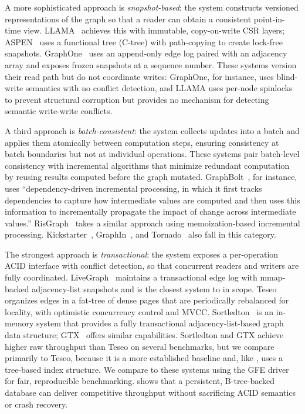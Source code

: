 A more sophisticated approach is \emph{snapshot-based}: the system constructs versioned representations of the graph so that a reader can obtain a consistent point-in-time view.
LLAMA~\cite{llama} achieves this with immutable, copy-on-write CSR layers; ASPEN~\cite{10.1145/3314221.3314598} uses a functional tree (C-tree) with path-copying to create lock-free snapshots.
GraphOne~\cite{graphone2019kumar} uses an append-only edge log paired with an adjacency array and exposes frozen snapshots at a sequence number.
These systems version their read path but do not coordinate writes: GraphOne, for instance, uses blind-write semantics with no conflict detection, and LLAMA uses per-node spinlocks to prevent structural corruption but provides no mechanism for detecting semantic write-write conflicts.

A third approach is \emph{batch-consistent}: the system collects updates into a batch and applies them atomically between computation steps, ensuring consistency at batch boundaries but not at individual operations.
These systems pair batch-level consistency with incremental algorithms that minimize redundant computation by reusing results computed before the graph mutated.
GraphBolt~\cite{mariappan2019graphbolt}, for instance, uses ``dependency-driven incremental processing, in which it first tracks dependencies to capture how intermediate values are computed and then uses this information to incrementally propagate the impact of change across intermediate values.''
RisGraph~\cite{feng2021risgraph} takes a similar approach using memoization-based incremental processing.
Kickstarter~\cite{vora2017kickstarter}, GraphIn~\cite{sengupta2016graphin}, and Tornado~\cite{shi2016tornado} also fall in this category.

The strongest approach is \emph{transactional}: the system exposes a per-operation ACID interface with conflict detection, so that concurrent readers and writers are fully coordinated.
LiveGraph~\cite{zhu2019livegraph} maintains a transactional edge log with mmap-backed adjacency-list snapshots and is the closest system to \project{} in scope.
Teseo~\cite{teseo2021deLeo} organizes edges in a fat-tree of dense pages that are periodically rebalanced for locality, with optimistic concurrency control and MVCC.
Sortledton~\cite{sortledton2022Fuchs} is an in-memory system that provides a fully transactional adjacency-list-based graph data structure; GTX~\cite{libinzhou2025GTX} offers similar capabilities.
Sortledton and GTX achieve higher raw throughput than Teseo on several benchmarks, but we compare primarily to Teseo, because it is a more established baseline and, like \project{}, uses a tree-based index structure.
We compare to these systems using the GFE driver~\cite{teseo2021deLeo} for fair, reproducible benchmarking.
\project{} shows that a persistent, B-tree-backed database can deliver competitive throughput without sacrificing ACID semantics or crash recovery.

